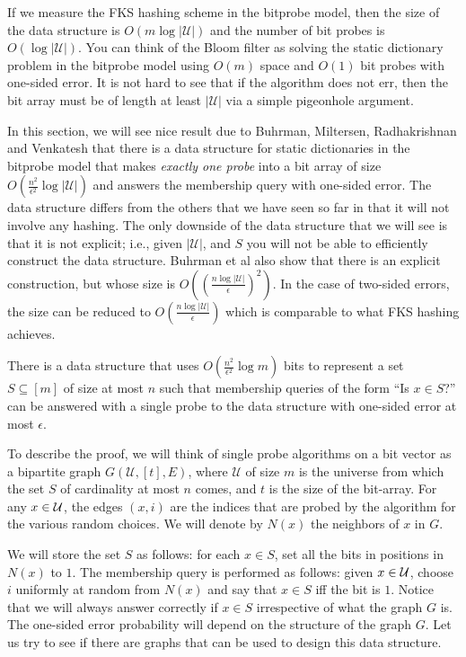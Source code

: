 If we measure the FKS hashing scheme in the bitprobe model, then the size of the
data structure is $O(m\log |\mathcal{U}|)$ and the number of bit probes is
$O(\log |\mathcal{U}|)$. You can think of the Bloom filter as solving the static
dictionary problem in the bitprobe model using $O(m)$ space and $O(1)$ bit
probes with one-sided error. It is not hard to see that if the algorithm does
not err, then the bit array must be of length at least $|\mathcal{U}|$ via a
simple pigeonhole argument.

In this section, we will see nice result due to Buhrman, Miltersen,
Radhakrishnan and Venkatesh that there is a data structure for static
dictionaries in the bitprobe model that makes \emph{exactly one probe} into a
bit array of size $O\left(\tfrac{n^2}{\epsilon^2}\log |\mathcal{U}|\right)$ and
answers the membership query with one-sided error. The data structure differs
from the others that we have seen so far in that it will not involve any
hashing. The only downside of the data structure that we will see is that it is
not explicit; i.e., given $|\mathcal{U}|$, and $S$ you will not be able to
efficiently construct the data structure. Buhrman et al also show that there is
an explicit construction, but whose size is
$O\left(\left(\frac{n\log |\mathcal{U}|}{\epsilon} \right)^2 \right)$. In the
case of two-sided errors, the size can be reduced to
$O\left( \frac{n\log |\mathcal{U}|}{\epsilon} \right)$ which is comparable to
what FKS hashing achieves.

\begin{theorem}
  There is a data structure that uses
  $O\left(\frac{n^2}{\epsilon^2}\log m \right)$ bits to represent a set
  $S \subseteq [m]$ of size at most $n$ such that membership queries of the form
  ``Is $x\in S$?''  can be answered with a single probe to the data structure with
  one-sided error at most $\epsilon$.
  \label{thm:bitprobe-1-query}
\end{theorem}

To describe the proof, we will think of single probe algorithms on a bit vector
as a bipartite graph $G(\mathcal{U}, [t], E)$, where $\mathcal{U}$ of size $m$
is the universe from which the set $S$ of cardinality at most $n$ comes, and $t$
is the size of the bit-array. For any $x\in {\cal U}$, the edges $(x,i)$ are the
indices that are probed by the algorithm for the various random choices. We will denote by $N(x)$ the neighbors of $x$ in $G$.

We will store the set $S$ as follows: for each $x\in S$, set all the bits in
positions in $N(x)$ to $1$. The membership query is performed as follows: given
$x\in {\cal U}$, choose $i$ uniformly at random from $N(x)$ and say that
$x\in S$ iff the bit is $1$. Notice that we will always answer correctly if
$x\in S$ irrespective of what the graph $G$ is. The one-sided error probability
will depend on the structure of the graph $G$. Let us try to see if there are
graphs that can be used to design this data structure.

